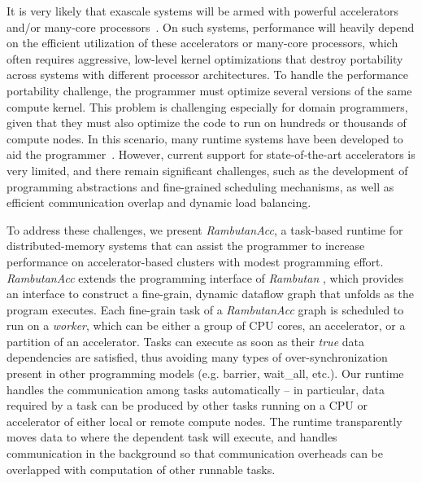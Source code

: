 It is very likely that exascale systems will be armed with powerful accelerators and/or many-core processors~\cite{ASCR/Exascale/Lethin, exascaleRoadMap}.
On such systems, performance will heavily depend on the efficient utilization of these accelerators or many-core processors, which often requires aggressive, low-level kernel optimizations that destroy portability across systems with different processor architectures.
To handle the performance portability challenge, the programmer must optimize several versions of the same compute kernel.
This problem is challenging especially for domain programmers, given that they must also optimize the code to run on hundreds or thousands of compute nodes.
In this scenario, many runtime systems have been developed to aid the programmer~\cite{legion,physics,mpiacc,mvapich2gpu}.
However, current support for state-of-the-art accelerators is very limited, and there remain significant challenges, such as the development of programming abstractions and fine-grained scheduling mechanisms, as well as efficient communication overlap and dynamic load balancing.  

To address these challenges, we present {\em RambutanAcc}, a task-based runtime for distributed-memory systems that can assist the programmer to increase performance on accelerator-based clusters with modest programming effort.
{\em RambutanAcc} extends the programming interface of {\em Rambutan} \cite{rambutanWebsite}, which provides an interface to construct a fine-grain, dynamic dataflow graph that unfolds as the program executes. 
Each fine-grain task of a {\em RambutanAcc} graph is scheduled to run on a {\em worker}, which can be either a group of CPU cores, an accelerator, or a partition of an accelerator.
Tasks can execute as soon as their {\em true} data dependencies are satisfied, thus avoiding many types of over-synchronization present in other programming models (e.g. barrier, wait\_all, etc.).
Our runtime handles the communication among tasks automatically -- in particular, data required by a task can be produced by other tasks running on a CPU or accelerator of either local or remote compute nodes.
The runtime transparently moves data to where the dependent task will execute, and
handles communication in the background so that communication overheads can be overlapped with computation of other runnable tasks.


